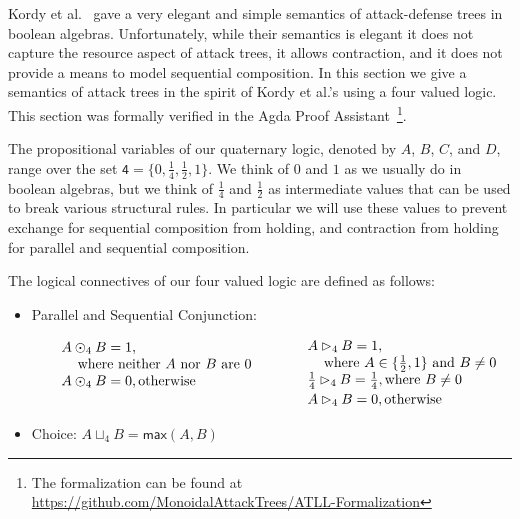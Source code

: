 \newcommand{\forth}{\frac{1}{4}}
\newcommand{\half}{\frac{1}{2}}

Kordy et al.~\cite{Kordy:2012} gave a very elegant and simple
semantics of attack-defense trees in boolean algebras.  Unfortunately,
while their semantics is elegant it does not capture the resource
aspect of attack trees, it allows contraction, and it does not provide
a means to model sequential composition.  In this section we give a
semantics of attack trees in the spirit of Kordy et al.'s using a four
valued logic.  This section was formally verified in the Agda Proof
Assistant~\cite{Norell:2009}\footnote{The formalization can be found at \url{https://github.com/MonoidalAttackTrees/ATLL-Formalization}}.

The propositional variables of our quaternary logic, denoted by $A$, $B$,
$C$, and $D$, range over the set $\mathsf{4} = \{0, \forth, \half,
1\}$.  We think of $0$ and $1$ as we usually do in boolean algebras,
but we think of $\forth$ and $\half$ as intermediate values that can
be used to break various structural rules.  In particular we will use
these values to prevent exchange for sequential composition from
holding, and contraction from holding for parallel and sequential
composition.
\begin{definition}
  \label{def:logical-connectives}
  The logical connectives of our four valued logic are defined as
  follows:
  \begin{itemize}
  \item[] Parallel and Sequential Conjunction:\vspace{-13px}
    \begin{center}
      \begin{math}
        \setlength{\arraycolsep}{10px}
        \begin{array}{lll}
          \begin{array}{lll}
            A \odot_4 B = 1,\\
            \,\,\,\,\,\,\,\text{where neither $A$ nor $B$ are $0$}\\
          A \odot_4 B = 0, \text{otherwise}\\
          \\
        \end{array}
        &
        \begin{array}{lll}          
          A \rhd_4 B = 1,\\
          \,\,\,\,\,\,\,\text{where } A \in \{\half, 1\} \text{ and } B \neq 0\\
          \forth \rhd_4 B = \forth, \text{where $B \neq 0$}\\[2px]         
          A \rhd_4 B = 0, \text{otherwise}
        \end{array}
        \end{array}
      \end{math}
    \end{center}
    \vspace{-5px}
  \item[] Choice: $A \sqcup_4 B = \mathsf{max}(A,B)$    
  \end{itemize}
\end{definition}
